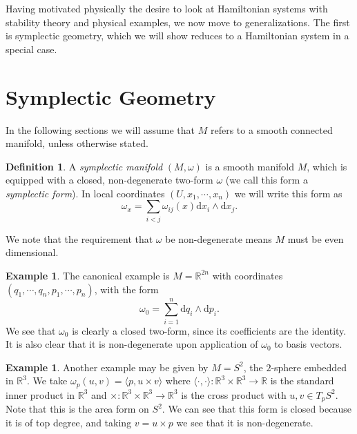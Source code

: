 \documentclass[psamsfonts,12pt]{amsart}
\newcommand\td{\mathrm{d}}
\newcommand\0{\mathbf{0}}
\theoremstyle{plain}
\theoremstyle{definition}
\newtheorem{dfn}[thm]{Definition} %
\newtheorem{ex}[thm]{Example} %
\newcommand{\bbR}{\mathbb{R}}
\begin{document}
Having motivated physically the desire to look at Hamiltonian systems with stability theory and physical examples, we now move to generalizations.  The first is symplectic geometry, which we will show reduces to a Hamiltonian system in a special case.










\section{Symplectic Geometry}
In the following sections we will assume that $M$ refers to a smooth connected manifold, unless otherwise stated.

\begin{dfn}
A \textit{symplectic manifold} $(M,\omega)$ is a smooth manifold $M$, which is equipped with a closed, non-degenerate two-form $\omega$ (we call this form a \textit{symplectic form}).  In local coordinates $(U,x_1,\cdots, x_n)$ we will write this form as
\[
\omega_x=\sum_{i<j}{\omega_{ij}(x) \td x_i\wedge \td x_j}.
\]
\end{dfn}

We note that the requirement that $\omega$ be non-degenerate means $M$ must be even dimensional.

\begin{ex}
The canonical example is $M=\bbR^{2n}$ with coordinates $(q_1,\cdots, q_n, p_1,\cdots, p_n)$, with the form
\[
\omega_0=\sum_{i=1}^{n}\td q_i\wedge \td p_i.
\]
We see that $\omega_0$ is clearly a closed two-form, since its coefficients are the identity.  It is also clear that it is non-degenerate upon application of $\omega_0$ to basis vectors.
\end{ex}


\begin{ex}
Another example may be given by $M=S^2$, the $2$-sphere embedded in $\bbR^3$.  We take $\omega_p(u,v)=\langle p, u\times v\rangle$ where $\langle \cdot, \cdot\rangle\colon \bbR^3\times \bbR^3 \rightarrow \bbR$ is the standard inner product in $\bbR^3$ and $\times\colon \bbR^3\times \bbR^3\rightarrow \bbR^3$ is the cross product with $u,v\in T_pS^2$.  Note that this is the area form on $S^2$.  We can see that this form is closed because it is of top degree, and taking $v=u\times p$ we see that it is non-degenerate.
\end{ex}

\end{document}
